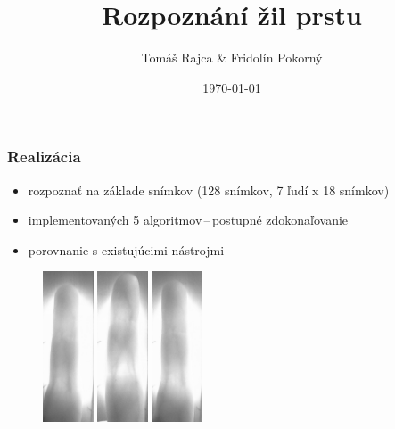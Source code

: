 \documentclass[compress]{beamer}
\begin{document}
\title{Rozpoznání žil prstu}
\author{Tomáš Rajca \& Fridolín Pokorný}
\date{\today}


\begin{frame}[plain]
  \titlepage
\end{frame}


\begin{frame}
  \frametitle{Realizácia}
  \begin{itemize}
    \item rozpoznať na základe snímkov (128 snímkov, 7 ľudí x 18 snímkov)
    \item implementovaných 5 algoritmov\,--\,postupné zdokonaľovanie
    \item porovnanie s existujúcimi nástrojmi
  \end{itemize}
\begin{figure}[ht!]
	\centering
	\includegraphics[width=1.5cm]{../fig/A_18.eps}
	\includegraphics[width=1.5cm]{../fig/A_10.eps}
	\includegraphics[width=1.5cm]{../fig/A_12.eps}
\end{figure}
\end{frame}
\end{document}
